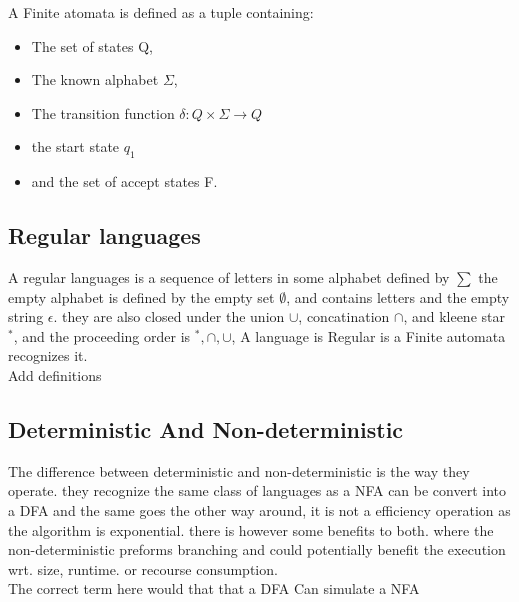 \documentclass[a4paper,10pt,titlepage]{report}
\begin{document}
A Finite atomata is defined as a tuple containing:
\begin{itemize}
\item The set of states Q, 
\item The known alphabet $\Sigma$, 
\item The transition function $\delta: Q \times \Sigma \longrightarrow Q$
\item the start state $q_1$ 
\item and the set of accept states F. \\
\end{itemize} 

	
\subsection{Regular languages}
	A regular languages is a sequence of letters in some alphabet defined by $\sum$ the empty alphabet is defined by the empty set $ \emptyset $, and contains letters and the empty string $ \epsilon $. they are also closed under the union $ \cup $, concatination $ \cap $, and kleene star $^*$, and the proceeding order is $^*, \cap, \cup$, A language is Regular is a Finite automata recognizes it.\\
	
	Add definitions
	

\subsection{Deterministic And Non-deterministic}

The difference between deterministic and non-deterministic is the way they operate. they recognize the same class of languages as a NFA can be  convert into a DFA and the same goes the other way around, it is not a efficiency operation as the algorithm is exponential. there is however some benefits to both. where the non-deterministic preforms branching and could potentially benefit the execution wrt. size, runtime. or recourse consumption. \\

The correct term here would that that a DFA Can simulate a NFA \\
\end{document}
